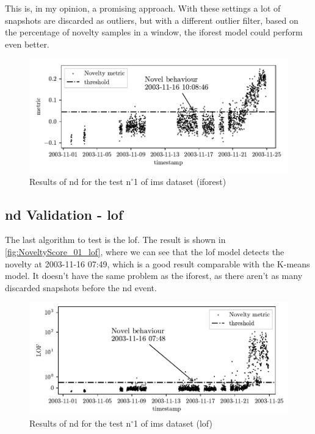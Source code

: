 This is, in my opinion, a promising approach. With these settings a lot of snapshots are discarded as outliers, but with a different outlier filter, based on the percentage of novelty samples in a window, the \gls{iforest} model could perform even better.
\begin{figure}
    \centering
    \includegraphics{images/IMS/Novelty_01_500samples_bearing3x_iforest.pdf}
    \caption{Results of \gls{nd} for the test $\text{n}^\circ$1 of \gls{ims} dataset (\gls{iforest})}
    \label{fig:NoveltyScore_01_iforest}
\end{figure}

\subsection{\gls{nd} Validation - \gls{lof}}
The last algorithm to test is the \gls{lof}. The result is shown in \autoref{fig:NoveltyScore_01_lof}, where we can see that the \gls{lof} model detects the novelty at 2003-11-16 07:49, which is a good result comparable with the K-means model. It doesn't have the same problem as the \gls{iforest}, as there aren't as many discarded snapshots before the \gls{nd} event.

\begin{figure}
    \centering
    \includegraphics{images/IMS/Novelty_01_500samples_bearing3x_lof.pdf}
    \caption{Results of \gls{nd} for the test $\text{n}^\circ$1 of \gls{ims} dataset (\gls{lof})}
    \label{fig:NoveltyScore_01_lof}
\end{figure}

